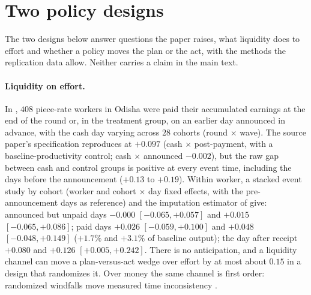 \documentclass[11pt,a4paper]{article}
\theoremstyle{plain}
\theoremstyle{definition}
\begin{document}
\section{Two policy designs}
\label{app:policy}

The two designs below answer questions the paper raises, what liquidity does to effort and whether a policy moves the
plan or the act, with the methods the replication data allow. Neither carries a claim in the main text.

\paragraph{Liquidity on effort.} In \citet{kaur2025}, $408$ piece-rate workers in Odisha were paid their accumulated
earnings at the end of the round or, in the treatment group, on an earlier day announced in advance, with the cash day
varying across $28$ cohorts (round $\times$ wave). The source paper's specification reproduces at $+0.097$ (cash
$\times$ post-payment, with a baseline-productivity control; cash $\times$ announced $-0.002$), but the raw gap between
cash and control groups is positive at every event time, including the days before the announcement ($+0.13$ to
$+0.19$). Within worker, a stacked event study by cohort (worker and cohort $\times$ day fixed effects, with the
pre-announcement days as reference) and the imputation estimator of \citet{bjs2024} give: announced but unpaid days
$-0.000$ $[-0.065,+0.057]$ and $+0.015$ $[-0.065,+0.086]$; paid days $+0.026$ $[-0.059,+0.100]$ and $+0.048$
$[-0.048,+0.149]$ ($+1.7\%$ and $+3.1\%$ of baseline output); the day after receipt $+0.080$ and $+0.126$
$[+0.005,+0.242]$. There is no anticipation, and a liquidity channel can move a plan-versus-act wedge over effort by at
most about $0.15$ in a design that randomizes it. Over money the same channel is first order: randomized windfalls move
measured time inconsistency \citep{cassidy2019}.
\end{document}
